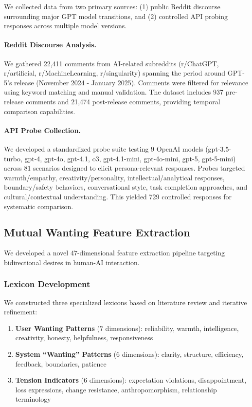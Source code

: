 \documentclass{article}
\begin{document}
We collected data from two primary sources: (1) public Reddit discourse surrounding major GPT model transitions, and (2) controlled API probing responses across multiple model versions.

\paragraph{Reddit Discourse Analysis.}
We gathered 22,411 comments from AI-related subreddits (r/ChatGPT, r/artificial, r/MachineLearning, r/singularity) spanning the period around GPT-5's release (November 2024 - January 2025). Comments were filtered for relevance using keyword matching and manual validation. The dataset includes 937 pre-release comments and 21,474 post-release comments, providing temporal comparison capabilities.

\paragraph{API Probe Collection.}
We developed a standardized probe suite testing 9 OpenAI models (gpt-3.5-turbo, gpt-4, gpt-4o, gpt-4.1, o3, gpt-4.1-mini, gpt-4o-mini, gpt-5, gpt-5-mini) across 81 scenarios designed to elicit persona-relevant responses. Probes targeted warmth/empathy, creativity/personality, intellectual/analytical responses, boundary/safety behaviors, conversational style, task completion approaches, and cultural/contextual understanding. This yielded 729 controlled responses for systematic comparison.

\subsection{Mutual Wanting Feature Extraction}

We developed a novel $47$-dimensional feature extraction pipeline targeting bidirectional desires in human-AI interaction.

\subsubsection{Lexicon Development}

We constructed three specialized lexicons based on literature review and iterative refinement:

\begin{enumerate}
    \item \textbf{User Wanting Patterns} ($7$ dimensions): reliability, warmth, intelligence, creativity, honesty, helpfulness, responsiveness
    \item \textbf{System ``Wanting'' Patterns} ($6$ dimensions): clarity, structure, efficiency, feedback, boundaries, patience  
    \item \textbf{Tension Indicators} ($6$ dimensions): expectation violations, disappointment, loss expressions, change resistance, anthropomorphism, relationship terminology
\end{enumerate}
\end{document}
